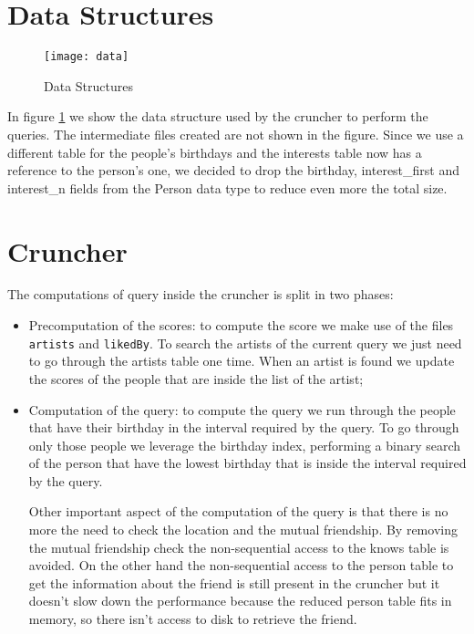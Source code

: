 \section{Data Structures}

\begin{figure}[tbh]
\texttt{[image: data]}
\caption[Data]{Data Structures}
\label{fig:data}
\end{figure}

In figure \ref{fig:data} we show the data structure used by the cruncher to perform the queries. The intermediate files created are not shown in the figure. Since we use a different table for the people's birthdays and the interests table now has a reference to the person's one, we decided to drop the birthday, interest\_first and interest\_n fields from the Person data type to reduce even more the total size.


\section{Cruncher}
The computations of query inside the cruncher is split in two phases:
\begin{itemize}
\item Precomputation of the scores: to compute the score we make use of the files \texttt{artists} and \texttt{likedBy}. To search the artists of the current query we just need to go through the artists table one time. When an artist is found we update the scores of the people that are inside the list of the artist;
\item Computation of the query: to compute the query we run through the people that have their birthday in the interval required by the query. To go through only those people we leverage the birthday index, performing a binary search of the person that have the lowest birthday that is inside the interval required by the query.\par Other important  aspect of the computation of the query is that there is no more the need to check the location and the mutual friendship. By removing the mutual friendship check the non-sequential access to the knows table is avoided. On the other hand the non-sequential access to the person table to get the information about the friend is still present in the cruncher but it doesn't slow down the performance because the reduced person table fits in memory, so there isn't access to disk to retrieve the friend. 
\end{itemize}  

